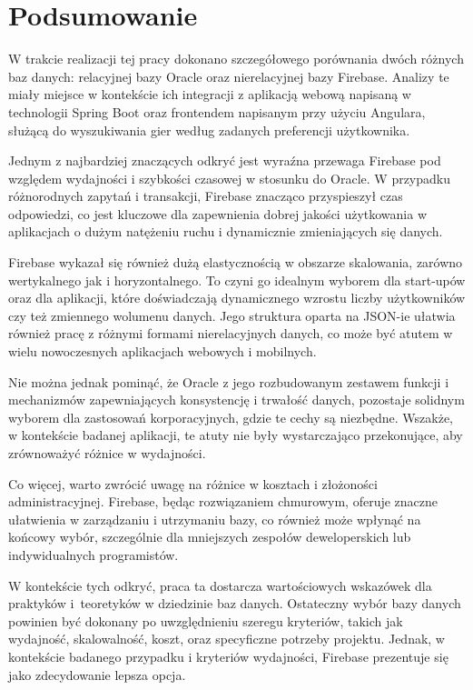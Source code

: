 \chapter*{Podsumowanie}

W trakcie realizacji tej pracy dokonano szczegółowego porównania dwóch różnych baz danych: relacyjnej bazy Oracle oraz nierelacyjnej bazy Firebase. Analizy te miały miejsce w kontekście ich integracji z aplikacją webową napisaną w technologii Spring Boot oraz frontendem napisanym przy użyciu Angulara, służącą do wyszukiwania gier według zadanych preferencji użytkownika.

Jednym z najbardziej znaczących odkryć jest wyraźna przewaga Firebase pod względem wydajności i szybkości czasowej w stosunku do Oracle. W przypadku różnorodnych zapytań i transakcji, Firebase znacząco przyspieszył czas odpowiedzi, co jest kluczowe dla zapewnienia dobrej jakości użytkowania w aplikacjach o dużym natężeniu ruchu i dynamicznie zmieniających się danych.

Firebase wykazał się również dużą elastycznością w obszarze skalowania, zarówno wertykalnego jak i horyzontalnego. To czyni go idealnym wyborem dla start-upów oraz dla aplikacji, które doświadczają dynamicznego wzrostu liczby użytkowników czy też zmiennego wolumenu danych. Jego struktura oparta na JSON-ie ułatwia również pracę z różnymi formami nierelacyjnych danych, co może być atutem w wielu nowoczesnych aplikacjach webowych i mobilnych.

Nie można jednak pominąć, że Oracle z jego rozbudowanym zestawem funkcji i mechanizmów zapewniających konsystencję i trwałość danych, pozostaje solidnym wyborem dla zastosowań korporacyjnych, gdzie te cechy są niezbędne. Wszakże, w kontekście badanej aplikacji, te atuty nie były wystarczająco przekonujące, aby zrównoważyć różnice w wydajności.

Co więcej, warto zwrócić uwagę na różnice w kosztach i złożoności administracyjnej. Firebase, będąc rozwiązaniem chmurowym, oferuje znaczne ułatwienia w zarządzaniu i utrzymaniu bazy, co również może wpłynąć na końcowy wybór, szczególnie dla mniejszych zespołów deweloperskich lub indywidualnych programistów.

W kontekście tych odkryć, praca ta dostarcza wartościowych wskazówek dla praktyków i~teoretyków w dziedzinie baz danych. Ostateczny wybór bazy danych powinien być dokonany po uwzględnieniu szeregu kryteriów, takich jak wydajność, skalowalność, koszt, oraz specyficzne potrzeby projektu. Jednak, w kontekście badanego przypadku i kryteriów wydajności, Firebase prezentuje się jako zdecydowanie lepsza opcja.